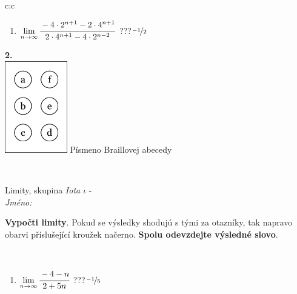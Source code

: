 \documentclass[10pt]{report}
\begin{document}
\begin{tabular}{c:c}
\begin{minipage}[c][104.5mm][t]{0.5\linewidth}
\begin{center}
\begin{minipage}{0.79\linewidth}
\begin{center}
\begin{varwidth}{\linewidth}
\begin{enumerate}
\item $\lim\limits_{n\to\infty}\cfrac{-4\cdot 2^{n+1}-2\cdot 4^{n+1}}{2\cdot 4^{n+1}-4\cdot 2^{n-2}}$\quad \dotfill\; ???\;\dotfill \quad $\nicefrac{-1}{2}$
\end{enumerate}
\end{varwidth}
\end{center}
\end{minipage}
\begin{minipage}{0.20\linewidth}
\begin{center}
{\Huge\bfseries 2.} \\[2mm]
\includegraphics[height=40mm]{../images/braille.png}
{\small Písmeno Braillovej abecedy}
\end{center}
\end{minipage}
\end{center}
\end{minipage}
\\ \hdashline
\begin{minipage}[c][104.5mm][t]{0.5\linewidth}
\begin{center}
\vspace{7mm}
{\huge Limity, skupina \textit{Iota $\iota$} -}\\[5mm]
\textit{Jméno:}\phantom{xxxxxxxxxxxxxxxxxxxxxxxxxxxxxxxxxxxxxxxxxxxxxxxxxxxxxxxxxxxxxxxxx}\\[5mm]
\begin{minipage}{0.95\linewidth}
\begin{center}
\textbf{Vypočti limity}. Pokud se výsledky shodujú s tými za otazníky, tak napravo\\obarvi příslušející kroužek načerno. \textbf{Spolu odevzdejte výsledné slovo}.
\end{center}
\end{minipage}
\\[1mm]
\begin{minipage}{0.79\linewidth}
\begin{center}
\begin{varwidth}{\linewidth}
\begin{enumerate}
\normalsize
\item $\lim\limits_{n\to\infty}\cfrac{-4-n}{2+5n}$\quad \dotfill\; ???\;\dotfill \quad $\nicefrac{-1}{5}$

\end{enumerate}
\end{varwidth}
\end{center}
\end{minipage}
\end{center}
\end{minipage}
\end{tabular}
\end{document}
